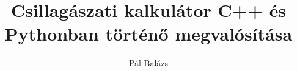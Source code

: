 \documentclass[a4paper,12pt,twoside]{report}
\begin{document}
\title{\LARGE {\bf Csillagászati kalkulátor C++ és Pythonban történő megvalósítása}\\
 \vspace*{6mm}
}

\author{Pál Balázs}

\normallinespacing
\maketitle

\preface


\body




\appendix
\end{document}
